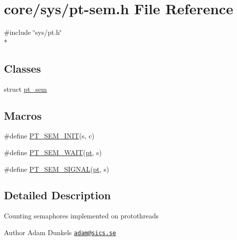 \hypertarget{pt-sem_8h}{\section{core/sys/pt-\/sem.h File Reference}
\label{pt-sem_8h}
}
{\ttfamily \#include \char`\"{}sys/pt.\-h\char`\"{}}\\*
\subsection*{Classes}
\begin{DoxyCompactItemize}
\item 
struct \hyperlink{structpt__sem}{pt\-\_\-sem}
\end{DoxyCompactItemize}
\subsection*{Macros}
\begin{DoxyCompactItemize}
\item 
\#define \hyperlink{group__ptsem_gad7089c5dc86f12019f0361d82a75b04b}{P\-T\-\_\-\-S\-E\-M\-\_\-\-I\-N\-I\-T}(s, c)
\item 
\#define \hyperlink{group__ptsem_ga386ff87a52a840512906f2940e229e2e}{P\-T\-\_\-\-S\-E\-M\-\_\-\-W\-A\-I\-T}(\hyperlink{structpt}{pt}, s)
\item 
\#define \hyperlink{group__ptsem_ga1eaaf4d9d75e24582acc6440d7085f19}{P\-T\-\_\-\-S\-E\-M\-\_\-\-S\-I\-G\-N\-A\-L}(\hyperlink{structpt}{pt}, s)
\end{DoxyCompactItemize}


\subsection{Detailed Description}
Counting semaphores implemented on protothreads \begin{DoxyAuthor}{Author}
Adam Dunkels \href{mailto:adam@sics.se}{\tt adam@sics.\-se} 
\end{DoxyAuthor}
